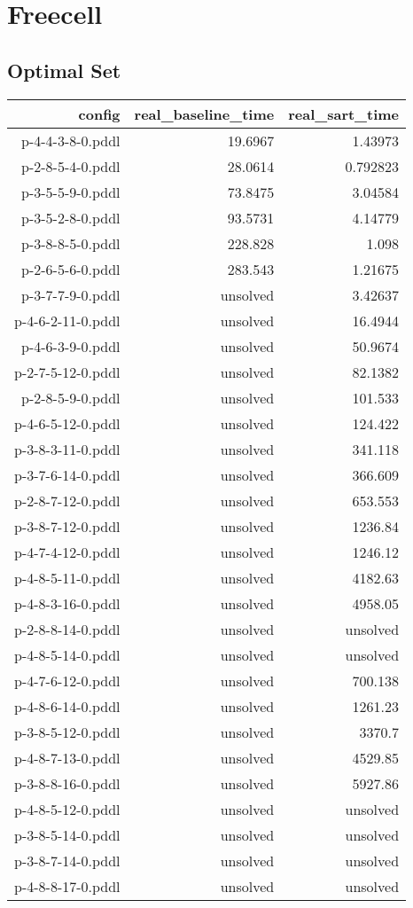 \documentclass{article}
\begin{document}
                \newpage \section{Freecell}
                    \subsection*{Optimal Set}
                    
                            \begin{center}
                            \scriptsize
                            \begin{tabular}{r|r|r}
                            config & real\_baseline\_time & real\_sart\_time\\\midrule
                             p-4-4-3-8-0.pddl&19.6967&1.43973\\
 p-2-8-5-4-0.pddl&28.0614&0.792823\\
 p-3-5-5-9-0.pddl&73.8475&3.04584\\
 p-3-5-2-8-0.pddl&93.5731&4.14779\\
 p-3-8-8-5-0.pddl&228.828&1.098\\
 p-2-6-5-6-0.pddl&283.543&1.21675\\
 p-3-7-7-9-0.pddl&unsolved&3.42637\\
 p-4-6-2-11-0.pddl&unsolved&16.4944\\
 p-4-6-3-9-0.pddl&unsolved&50.9674\\
 p-2-7-5-12-0.pddl&unsolved&82.1382\\
 p-2-8-5-9-0.pddl&unsolved&101.533\\
 p-4-6-5-12-0.pddl&unsolved&124.422\\
 p-3-8-3-11-0.pddl&unsolved&341.118\\
 p-3-7-6-14-0.pddl&unsolved&366.609\\
 p-2-8-7-12-0.pddl&unsolved&653.553\\
 p-3-8-7-12-0.pddl&unsolved&1236.84\\
 p-4-7-4-12-0.pddl&unsolved&1246.12\\
 p-4-8-5-11-0.pddl&unsolved&4182.63\\
 p-4-8-3-16-0.pddl&unsolved&4958.05\\
 p-2-8-8-14-0.pddl&unsolved&unsolved\\
 p-4-8-5-14-0.pddl&unsolved&unsolved\\
 p-4-7-6-12-0.pddl&unsolved&700.138\\
 p-4-8-6-14-0.pddl&unsolved&1261.23\\
 p-3-8-5-12-0.pddl&unsolved&3370.7\\
 p-4-8-7-13-0.pddl&unsolved&4529.85\\
 p-3-8-8-16-0.pddl&unsolved&5927.86\\
 p-4-8-5-12-0.pddl&unsolved&unsolved\\
 p-3-8-5-14-0.pddl&unsolved&unsolved\\
 p-3-8-7-14-0.pddl&unsolved&unsolved\\
 p-4-8-8-17-0.pddl&unsolved&unsolved
                            \end{tabular}
                            \end{center}
                    
\end{document}
